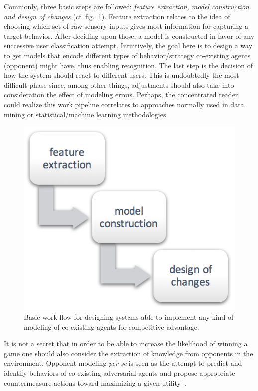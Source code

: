 Commonly, three basic steps are followed: \textit{feature extraction, model construction and design of changes} (cf. fig.~\ref{behaviorModWorkFlow}). Feature extraction relates to the idea of choosing which set of raw sensory inputs gives most information for capturing a target behavior. After deciding upon those, a model is constructed in favor of any successive user classification attempt. Intuitively, the goal here is to design a way to get models that encode different types of behavior/strategy co-existing agents (opponent) might have, thus enabling recognition. The last step is the decision of how the system should react to different users. This is undoubtedly the most difficult phase since, among other things, adjustments should also take into consideration the effect of modeling errors. Perhaps, the concentrated reader could realize this work pipeline correlates to approaches normally used in data mining or statistical/machine learning methodologies.

\begin{figure}[htp]
  \centering  
  \includegraphics[scale=0.6]{images/02-art/oppmodelproc.png}
  \caption{Basic work-flow for designing systems able to implement any kind of modeling of co-existing agents for competitive advantage.}
   \label{behaviorModWorkFlow}
\end{figure}

It is not a secret that in order to be able to increase the likelihood of winning a game one should also consider the extraction of knowledge from opponents in the environment. Opponent modeling \textit{per se} is seen as the attempt to predict and identify behaviors of co-existing adversarial agents and propose appropriate countermeasure actions toward maximizing a given utility~\cite{fathzadeh_opponent_2007}.


